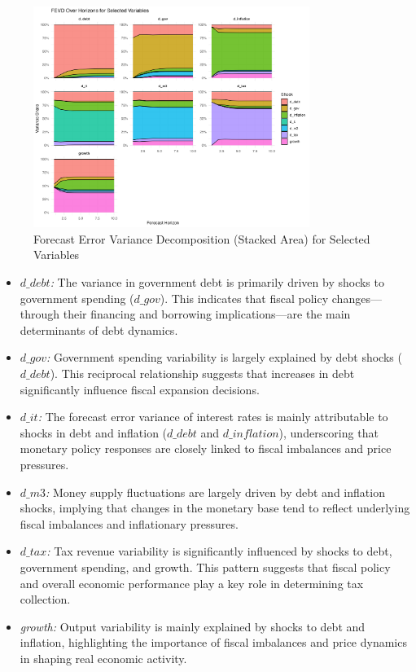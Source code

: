 \documentclass[a4paper,12pt]{article}
\begin{document}
\begin{figure}[H]
  \centering
  \includegraphics[width=0.8\textwidth]{../results/fevd_stacked_area.png}
  \caption{Forecast Error Variance Decomposition (Stacked Area) for Selected Variables}
  \label{fig:fevd_area}
\end{figure}

\begin{itemize}
    \item \textit{\(d\_debt\):} The variance in government debt is primarily driven by shocks to government spending (\(d\_gov\)). This indicates that fiscal policy changes—through their financing and borrowing implications—are the main determinants of debt dynamics.
    
    \item \textit{\(d\_gov\):} Government spending variability is largely explained by debt shocks (\(d\_debt\)). This reciprocal relationship suggests that increases in debt significantly influence fiscal expansion decisions.
    
    \item \textit{\(d\_it\):} The forecast error variance of interest rates is mainly attributable to shocks in debt and inflation (\(d\_debt\) and \(d\_inflation\)), underscoring that monetary policy responses are closely linked to fiscal imbalances and price pressures.
    
    \item \textit{\(d\_m3\):} Money supply fluctuations are largely driven by debt and inflation shocks, implying that changes in the monetary base tend to reflect underlying fiscal imbalances and inflationary pressures.
    
    \item \textit{\(d\_tax\):} Tax revenue variability is significantly influenced by shocks to debt, government spending, and growth. This pattern suggests that fiscal policy and overall economic performance play a key role in determining tax collection.
    
    \item \textit{growth:} Output variability is mainly explained by shocks to debt and inflation, highlighting the importance of fiscal imbalances and price dynamics in shaping real economic activity.
\end{itemize}
\end{document}
